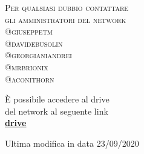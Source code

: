 \documentclass[a4paper, 11pt, oneside, article]{book} %
\begin{document}
\begin{titlepage}
	{  \scshape 
		Per qualsiasi dubbio contattare\\ 
		gli amministratori del network \break \\ 
		@giuseppetm \\ 
		@davidebusolin \\
		@georgianiandrei \\
		@mrbrionix \\
		@aconithorn \\
		
		} %
	
	\vspace{3\baselineskip} %
	
	È possibile accedere al drive \\del network al seguente link\\
	\textbf{\href{https://drive.google.com/drive/folders/0BwzuyD3iLGcbcUNxTVNOVE9FR1E}{drive}}
	
	
	\vfill %
	
	
	{\large Ultima modifica in data 23/09/2020} 

\end{titlepage}


\end{document}

